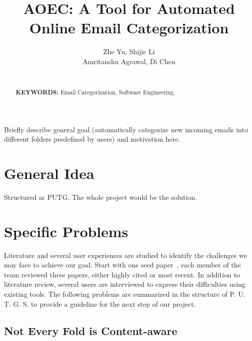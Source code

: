 \documentclass{sig-alternate-05-2015}
\begin{document}

\title{AOEC: A Tool for Automated Online Email Categorization  }
\author{
\alignauthor
Zhe Yu, Shijie Li\\ Amritanshu Agrawal, Di Chen\\ %
       \\
}

\maketitle
 
\begin{abstract}

 

{\bf KEYWORDS:}
Email Categorization,  Software Engineering.

\end{abstract}

Briefly describe general goal (automatically categorize new incoming emails into different folders predefined by users) and motivation here.


\section{General Idea}

Structured as PUTG. The whole project would be the solution.


\section{Specific Problems}

Literature and several user experiences are studied to identify the challenges we may face to achieve our goal. Start with one seed paper~\cite{bekkerman2004automatic}, each member of the team reviewed three papers, either highly cited or most recent. In addition to literature review, several users are interviewed to express their difficulties using existing tools. The following problems are summarized in the structure of P. U. T. G. S. to provide a guideline for the next step of our project.

\subsection{Not Every Fold is Content-aware}
\end{document}
